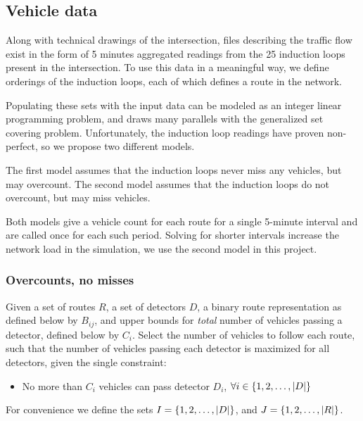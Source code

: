

\subsection{Vehicle data}

Along with technical drawings of the intersection, files describing the traffic flow exist in the form of 5 minutes aggregated readings from the 25 induction loops present in the intersection.
To use this data in a meaningful way, we define orderings of the induction loops, each of which defines a route in the network. 

Populating these sets with the input data can be modeled as an integer linear programming problem, and draws many parallels with the generalized set covering problem.
Unfortunately, the induction loop readings have proven non-perfect, so we propose two different models.

The first model assumes that the induction loops never miss any vehicles, but may overcount.
The second model assumes that the induction loops do not overcount, but may miss vehicles. 

Both models give a vehicle count for each route for a single 5-minute interval and are called once for each such period.
Solving for shorter intervals increase the network load in the simulation, we use the second model in this project.

\subsubsection{Overcounts, no misses}
Given a set of routes $R$, a set of detectors $D$, a binary route representation as defined below by $B_{ij}$, and upper bounds for \textit{total} number of vehicles passing a detector, defined below by $C_i$. 
Select the number of vehicles to follow each route, such that the number of vehicles passing each detector is maximized for all detectors, given the single constraint:
\begin{itemize}
  \item No more than $C_i$ vehicles can pass detector $D_i$, $\forall i \in \left\{1, 2, \ldots, |D|\right\}$
\end{itemize}

For convenience we define the sets $I = \left\{1, 2, \ldots, |D|\right\}$, and $J = \left\{1, 2, \ldots, |R|\right\}$.

